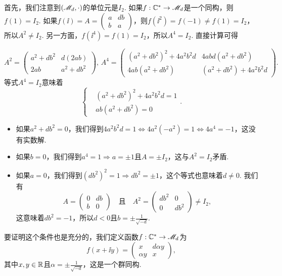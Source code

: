 \begin{solution}
  \begin{enuma}\setcounter{enumi}{1}
    \item  首先，我们注意到$(\mathscr M_d,\cdot)$的单位元是$I_2$. 如果$f:\mathbb C^\ast\to\mathscr M_d$是一个同构，则$f(1)=I_2$. 如果$f(\ii)=A=\begin{pmatrix}
          a & db \\
          b & a
        \end{pmatrix}$，则$f(\ii^2)=f(-1)\ne f(1)=I_2$，所以$A^2\ne I_2$. 另一方面，$f(\ii^4)=f(1)=I_2$，所以$A^4=I_2$. 直接计算可得
  \end{enuma}
  \[
    A^2 = \begin{pmatrix}
      a^2 + db^2 & d(2ab) \\
      2ab & a^2 + db^2
    \end{pmatrix},\,
    A^4 = \begin{pmatrix}
      (a^2+db^2)^2 + 4a^2b^2d & 4abd(a^2+db^2) \\
      4ab(a^2+db^2) & (a^2+db^2) + 4a^2b^2d
    \end{pmatrix}.
  \]
  等式$A^4=I_2$意味着
  \[
    \left\{
      \begin{aligned}
        & (a^2+db^2)^2 + 4a^2b^2d = 1 \\
        & ab(a^2+db^2) = 0
      \end{aligned}
    \right..
  \]
  \begin{itemize}
    \item 如果$a^2+db^2=0$，我们得到$4a^2b^2d=1\Leftrightarrow
    4a^2(-a^2)=1\Leftrightarrow 4a^4=-1$，这没有实数解.
    \item 如果$b=0$，我们得到$a^4=1\Rightarrow a=\pm1$且$A=\pm I_2$，这与$A^2=I_2$矛盾.
    \item 如果$a=0$，我们得到$(db^2)^2=1\Rightarrow db^2=\pm1$，这个等式也意味着$d\ne0$. 我们有
    \[
      A = \begin{pmatrix}
        0 & db \\
        b & 0
      \end{pmatrix}\quad \text{且}\quad
      A^2 = \begin{pmatrix}
        db^2 & 0 \\
        0 & db^2
      \end{pmatrix} \ne I_2,
    \]
    这意味着$db^2=-1$，所以$d<0$且$b=\pm\frac1{\sqrt{-d}}$.
  \end{itemize}

  要证明这个条件也是充分的，我们定义函数$f:\mathbb C^\ast\to\mathscr M_d$为
  \[
    f(x + \ii y) = \begin{pmatrix}
      x & d\alpha y \\
      \alpha y & x
    \end{pmatrix},
  \]
  其中$x,y\in\mathbb R$且$\alpha=\pm\frac1{\sqrt{-d}}$，这是一个群同构.
\end{solution}

